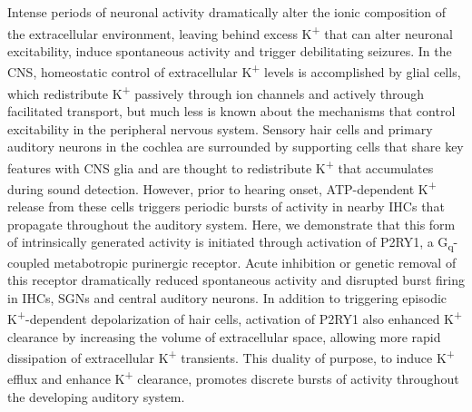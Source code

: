 \documentclass[9pt,lineno]{elife}
\begin{document}
Intense periods of neuronal activity dramatically alter the ionic composition of the extracellular environment, leaving behind excess K\textsuperscript{+} that can alter neuronal excitability, induce spontaneous activity and trigger debilitating seizures. In the CNS, homeostatic control of extracellular K\textsuperscript{+} levels is accomplished by glial cells, which redistribute K\textsuperscript{+} passively through ion channels and actively through facilitated transport, but much less is known about the mechanisms that control excitability in the peripheral nervous system. Sensory hair cells and primary auditory neurons in the cochlea are surrounded by supporting cells that share key features with CNS glia and are thought to redistribute K\textsuperscript{+} that accumulates during sound detection. However, prior to hearing onset, ATP-dependent K\textsuperscript{+} release from these cells triggers periodic bursts of activity in nearby IHCs that propagate throughout the auditory system. Here, we demonstrate that this form of intrinsically generated activity is initiated through activation of P2RY1, a G\textsubscript{q}-coupled metabotropic purinergic receptor. Acute inhibition or genetic removal of this receptor dramatically reduced spontaneous activity and disrupted burst firing in IHCs, SGNs and central auditory neurons. In addition to triggering episodic K\textsuperscript{+}-dependent depolarization of hair cells, activation of P2RY1 also enhanced K\textsuperscript{+} clearance by increasing the volume of extracellular space, allowing more rapid dissipation of extracellular K\textsuperscript{+} transients. This duality of purpose, to induce K\textsuperscript{+} efflux and enhance K\textsuperscript{+} clearance, promotes discrete bursts of activity throughout the developing auditory system.
\end{document}
